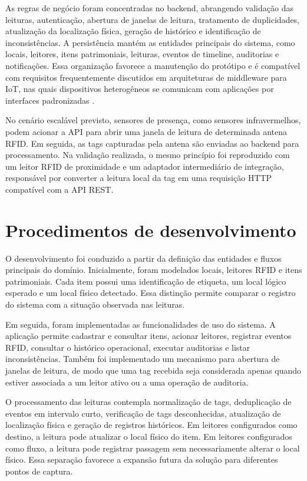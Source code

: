 As regras de negócio foram concentradas no backend, abrangendo validação das leituras, autenticação, abertura de janelas de leitura, tratamento de duplicidades, atualização da localização física, geração de histórico e identificação de inconsistências. A persistência mantém as entidades principais do sistema, como locais, leitores, itens patrimoniais, leituras, eventos de timeline, auditorias e notificações. Essa organização favorece a manutenção do protótipo e é compatível com requisitos frequentemente discutidos em arquiteturas de middleware para IoT, nas quais dispositivos heterogêneos se comunicam com aplicações por interfaces padronizadas \cite{razzaque2015}.

No cenário escalável previsto, sensores de presença, como sensores infravermelhos, podem acionar a API para abrir uma janela de leitura de determinada antena RFID. Em seguida, as tags capturadas pela antena são enviadas ao backend para processamento. Na validação realizada, o mesmo princípio foi reproduzido com um leitor RFID de proximidade e um adaptador intermediário de integração, responsável por converter a leitura local da tag em uma requisição HTTP compatível com a API REST.

\section{Procedimentos de desenvolvimento}

O desenvolvimento foi conduzido a partir da definição das entidades e fluxos principais do domínio. Inicialmente, foram modelados locais, leitores RFID e itens patrimoniais. Cada item possui uma identificação de etiqueta, um local lógico esperado e um local físico detectado. Essa distinção permite comparar o registro do sistema com a situação observada nas leituras.

Em seguida, foram implementadas as funcionalidades de uso do sistema. A aplicação permite cadastrar e consultar itens, acionar leitores, registrar eventos RFID, consultar o histórico operacional, executar auditorias e listar inconsistências. Também foi implementado um mecanismo para abertura de janelas de leitura, de modo que uma tag recebida seja considerada apenas quando estiver associada a um leitor ativo ou a uma operação de auditoria.

O processamento das leituras contempla normalização de tags, deduplicação de eventos em intervalo curto, verificação de tags desconhecidas, atualização de localização física e geração de registros históricos. Em leitores configurados como destino, a leitura pode atualizar o local físico do item. Em leitores configurados como fluxo, a leitura pode registrar passagem sem necessariamente alterar o local físico. Essa separação favorece a expansão futura da solução para diferentes pontos de captura.

